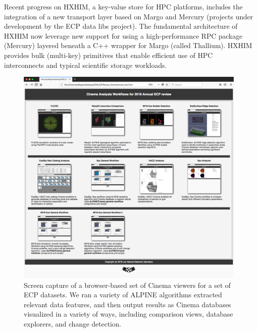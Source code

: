 
Recent progress on HXHIM, a key-value store for HPC platforms, includes the
integration of a new transport layer based on Margo and Mercury (projects
under development by the ECP data libs project). The fundamental architecture
of HXHIM now leverage new support for using a high-performance RPC package
(Mercury) layered beneath a C++ wrapper for Margo (called Thallium). HXHIM
provides bulk (multi-key) primitives that enable efficient use of HPC
interconnects and typical scientific storage workloads.

\begin{figure}[htb]
	\centering
	\includegraphics[width=5in]{projects/2.3.4-DataViz/2.3.4.02-LANL-ATDM-DataViz/ECPReviewScreenshot.png}
	\caption{
        Screen capture of a browser-based set of Cinema viewers 
        for a set of ECP datasets. We ran a variety of ALPINE algorithms
        extracted relevant data features, and then output 
        results as Cinema databases visualized in
        a variety of ways, including comparison views, database
        explorers, and change detection.
    }
\end{figure}

